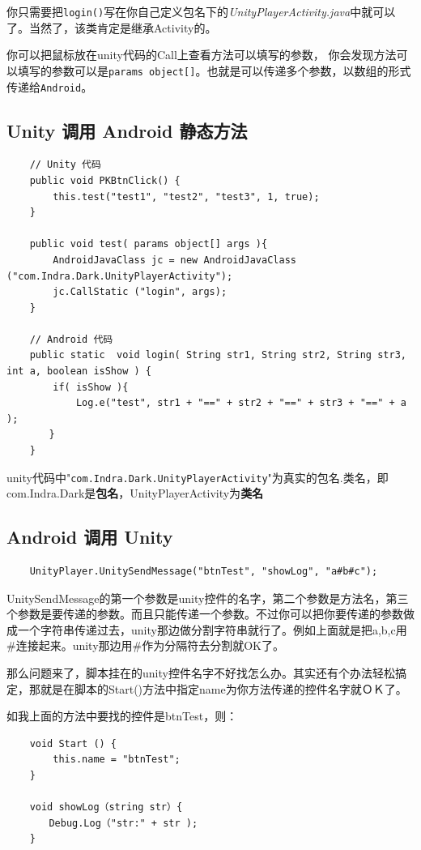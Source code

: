 \documentclass[UTF8,a4paper,12pt]{ctexbook}
\begin{document}
			你只需要把\verb|login()|写在你自己定义包名下的\textit{UnityPlayerActivity.java}中就可以了。当然了，该类肯定是继承Activity的。
			
			你可以把鼠标放在unity代码的Call上查看方法可以填写的参数， 你会发现方法可以填写的参数可以是\verb|params object[]|。也就是可以传递多个参数，以数组的形式传递给\verb|Android|。
		
		\subsection{Unity 调用 Android 静态方法}
			\begin{lstlisting}
	// Unity 代码
	public void PKBtnClick() {
	    this.test("test1", "test2", "test3", 1, true);
	}
	
	public void test( params object[] args ){
	    AndroidJavaClass jc = new AndroidJavaClass ("com.Indra.Dark.UnityPlayerActivity");
	    jc.CallStatic ("login", args);
	}
	
	// Android 代码
	public static  void login( String str1, String str2, String str3, int a, boolean isShow ) {
	    if( isShow ){            
	        Log.e("test", str1 + "==" + str2 + "==" + str3 + "==" + a );
	　　}
	}
			\end{lstlisting}
			
			unity代码中"\verb|com.Indra.Dark.UnityPlayerActivity|"为真实的包名.类名，即com.Indra.Dark是\textbf{包名}，UnityPlayerActivity为\textbf{类名}
				
		\subsection{Android 调用 Unity}
			\begin{lstlisting}
	UnityPlayer.UnitySendMessage("btnTest", "showLog", "a#b#c");
			\end{lstlisting}
			
			UnitySendMessage的第一个参数是unity控件的名字，第二个参数是方法名，第三个参数是要传递的参数。而且只能传递一个参数。不过你可以把你要传递的参数做成一个字符串传递过去，unity那边做分割字符串就行了。例如上面就是把a,b,c用\#连接起来。unity那边用\#作为分隔符去分割就OK了。
		
			那么问题来了，脚本挂在的unity控件名字不好找怎么办。其实还有个办法轻松搞定，那就是在脚本的Start()方法中指定name为你方法传递的控件名字就ＯＫ了。
			
			如我上面的方法中要找的控件是btnTest，则：
			\begin{lstlisting}
	void Start () {
	    this.name = "btnTest";
	}
	
	void showLog（string str）{
	　　Debug.Log（"str:" + str );
	}
			\end{lstlisting}
	
\end{document}
